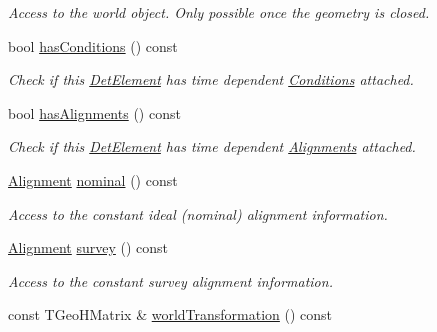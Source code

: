 \begin{DoxyCompactItemize}
\begin{DoxyCompactList}\small\item\em Access to the world object. Only possible once the geometry is closed. \item\end{DoxyCompactList}\item 
bool \hyperlink{class_d_d4hep_1_1_geometry_1_1_det_element_a2b0f3bf39905f9476b6f3add70eacf19}{hasConditions} () const 
\begin{DoxyCompactList}\small\item\em Check if this \hyperlink{class_d_d4hep_1_1_geometry_1_1_det_element}{DetElement} has time dependent \hyperlink{namespace_d_d4hep_1_1_conditions}{Conditions} attached. \item\end{DoxyCompactList}\item 
bool \hyperlink{class_d_d4hep_1_1_geometry_1_1_det_element_ab07f17438062035309f2ef52cfe22872}{hasAlignments} () const 
\begin{DoxyCompactList}\small\item\em Check if this \hyperlink{class_d_d4hep_1_1_geometry_1_1_det_element}{DetElement} has time dependent \hyperlink{namespace_d_d4hep_1_1_alignments}{Alignments} attached. \item\end{DoxyCompactList}\item 
\hyperlink{class_d_d4hep_1_1_alignments_1_1_alignment}{Alignment} \hyperlink{class_d_d4hep_1_1_geometry_1_1_det_element_af5c8d93fa7327838eee4911721f7fe2e}{nominal} () const 
\begin{DoxyCompactList}\small\item\em Access to the constant ideal (nominal) alignment information. \item\end{DoxyCompactList}\item 
\hyperlink{class_d_d4hep_1_1_alignments_1_1_alignment}{Alignment} \hyperlink{class_d_d4hep_1_1_geometry_1_1_det_element_a7656d819ab427f168ece0940353055f9}{survey} () const 
\begin{DoxyCompactList}\small\item\em Access to the constant survey alignment information. \item\end{DoxyCompactList}\item 
const TGeoHMatrix \& \hyperlink{class_d_d4hep_1_1_geometry_1_1_det_element_a60e3c04d0c0487207e62b98512a8f08c}{worldTransformation} () const 

\end{DoxyCompactItemize}
